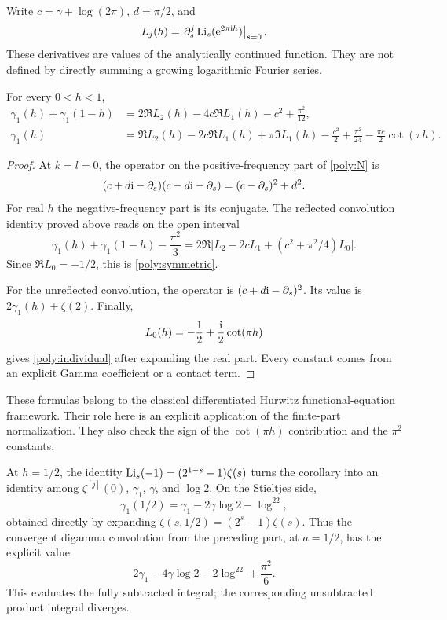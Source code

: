 Write \(c=\gamma+\log(2\pi)\), \(d=\pi/2\), and
\[
 L_j(h)=\left.\partial_s^j
                 \operatorname{Li}_s(\mathrm e^{2\pi\mathrm i h})\right|_{s=0}.
\]
These derivatives are values of the analytically continued function.
They are not defined by directly summing a growing logarithmic
Fourier series.

\begin{corollary}
\label{poly:gamma1}
For every \(0<h<1\),
\begin{align}
 \gamma_1(h)+\gamma_1(1-h)
 &=2\Re L_2(h)-4c\Re L_1(h)-c^2+\frac{\pi^2}{12},
 \label{poly:symmetric}\\
 \gamma_1(h)
 &=\Re L_2(h)-2c\Re L_1(h)+\pi\Im L_1(h)
      -\frac{c^2}{2}+\frac{\pi^2}{24}
      -\frac{\pi c}{2}\cot(\pi h).
 \label{poly:individual}
\end{align}
\end{corollary}

\begin{proof}
At \(k=l=0\), the operator on the positive-frequency part of
\eqref{poly:N} is
\[
 (c+d\mathrm i-\partial_s)(c-d\mathrm i-\partial_s)
       =(c-\partial_s)^2+d^2 .
\]
For real \(h\) the negative-frequency part is its conjugate.
The reflected convolution identity proved above reads on the open
interval
\[
 \gamma_1(h)+\gamma_1(1-h)-\frac{\pi^2}{3}
 =2\Re\bigl[L_2-2cL_1+(c^2+\pi^2/4)L_0\bigr].
\]
Since \(\Re L_0=-1/2\), this is \eqref{poly:symmetric}.

For the unreflected convolution, the operator is
\((c+d\mathrm i-\partial_s)^2\). Its value is
\(2\gamma_1(h)+\zeta(2)\). Finally,
\[
 L_0(h)=-\frac12+\frac{\mathrm i}{2}\cot(\pi h)
\]
gives \eqref{poly:individual} after expanding the real part.
Every constant comes from an explicit Gamma coefficient or
a contact term.
\end{proof}

These formulas belong to the classical differentiated Hurwitz
functional-equation framework. Their role here is an explicit
application of the finite-part normalization. They also check the
sign of the \(\cot(\pi h)\) contribution and the \(\pi^2\) constants.

At \(h=1/2\), the identity
\(\operatorname{Li}_s(-1)=(2^{1-s}-1)\zeta(s)\) turns the corollary into an identity
among \(\zeta^{[j]}(0)\), \(\gamma_1\), \(\gamma\), and \(\log2\).
On the Stieltjes side,
\[
 \gamma_1(1/2)=\gamma_1-2\gamma\log2-\log^22,
\]
obtained directly by expanding
\(\zeta(s,1/2)=(2^s-1)\zeta(s)\).
Thus the convergent digamma convolution from the preceding part,
at \(a=1/2\), has the explicit value
\begin{equation}\label{poly:half-convolution}
 2\gamma_1-4\gamma\log2-2\log^22+\frac{\pi^2}{6}.
\end{equation}
This evaluates the fully subtracted integral; the corresponding
unsubtracted product integral diverges.

